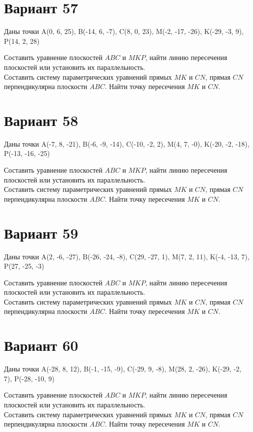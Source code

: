 \documentclass[11pt]{article}
\begin{document}
\section*{Вариант 57}
Даны точки A(0, 6, 25), B(-14, 6, -7), C(8, 0, 23), M(-2, -17, -26), K(-29, -3, 9), P(14, 2, 28)

Составить уравнение плоскостей $ABC$ и $MKP$, найти линию пересечения плоскостей или установить их параллельность.\\
Составить систему параметрических уравнений прямых $MK$ и $CN$, прямая $CN$ перпендикулярна плоскости $ABC$. Найти точку пересечения $MK$ и $CN$.

\section*{Вариант 58}
Даны точки A(-7, 8, -21), B(-6, -9, -14), C(-10, -2, 2), M(4, 7, -0), K(-20, -2, -18), P(-13, -16, -25)

Составить уравнение плоскостей $ABC$ и $MKP$, найти линию пересечения плоскостей или установить их параллельность.\\
Составить систему параметрических уравнений прямых $MK$ и $CN$, прямая $CN$ перпендикулярна плоскости $ABC$. Найти точку пересечения $MK$ и $CN$.

\section*{Вариант 59}
Даны точки A(2, -6, -27), B(-26, -24, -8), C(29, -27, 1), M(7, 2, 11), K(-4, -13, 7), P(27, -25, -3)

Составить уравнение плоскостей $ABC$ и $MKP$, найти линию пересечения плоскостей или установить их параллельность.\\
Составить систему параметрических уравнений прямых $MK$ и $CN$, прямая $CN$ перпендикулярна плоскости $ABC$. Найти точку пересечения $MK$ и $CN$.

\section*{Вариант 60}
Даны точки A(-28, 8, 12), B(-1, -15, -9), C(-29, 9, -8), M(28, 2, -26), K(-29, -2, 7), P(-28, -10, 9)

Составить уравнение плоскостей $ABC$ и $MKP$, найти линию пересечения плоскостей или установить их параллельность.\\
Составить систему параметрических уравнений прямых $MK$ и $CN$, прямая $CN$ перпендикулярна плоскости $ABC$. Найти точку пересечения $MK$ и $CN$.
\end{document}
